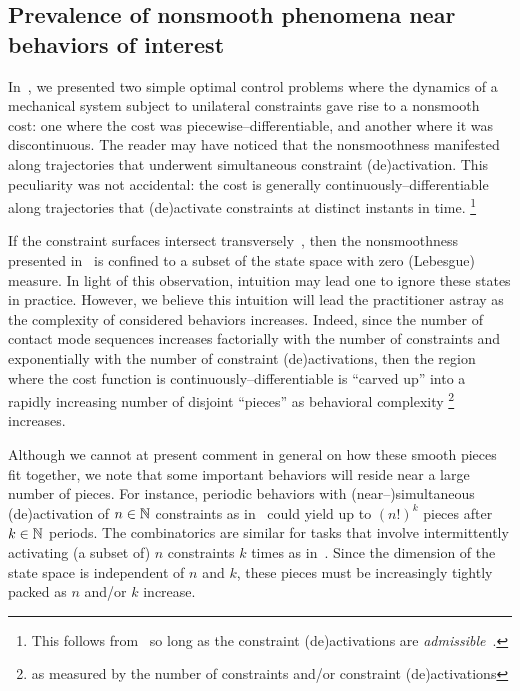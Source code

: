 \documentclass{article}
\begin{document}
\subsection{Prevalence of nonsmooth phenomena near behaviors of interest}
\label{sec:disc:models}
In~, we presented two simple optimal control problems where the dynamics of a mechanical system subject to unilateral constraints gave rise to a nonsmooth cost:
one where the cost was piecewise--differentiable,
and
another where it was discontinuous.
The reader may have noticed that the nonsmoothness manifested along trajectories that underwent simultaneous constraint (de)activation.
This peculiarity was not accidental:  
the cost is generally continuously--differentiable
along trajectories that (de)activate constraints at distinct instants in time.%
\footnote{This follows from~\cite[Eqn.~2.3]{Aizerman1958-ih} so long as the constraint (de)activations are \emph{admissible}~\cite[Def.~3,~Lem.~1]{Pace2017-tt}.}

If the constraint surfaces intersect transversely~\cite[Ch.~6]{Lee2012-mb},
then the nonsmoothness presented in~ is confined to a subset of the state space with zero (Lebesgue) measure. In light of this observation, intuition may lead one to ignore these states in practice. %
However, we believe this intuition will lead the practitioner astray as the complexity of considered behaviors increases.
%
Indeed, since the number of contact mode sequences increases 
factorially with the number of constraints
and 
exponentially with the number of constraint (de)activations,
then the region where the cost function is continuously--differentiable is ``carved up'' into a rapidly increasing number of disjoint ``pieces''
as behavioral complexity%
\footnote{as measured by the number of constraints and/or constraint (de)activations}
increases.

Although we cannot at present comment in general on how these smooth pieces fit together, we note that some important behaviors will reside near a large number of pieces.
For instance, periodic behaviors with (near--)simultaneous (de)activation of $n\in\mathbb{N}$ constraints as in~\cite{Alexander1984-ld} could yield up to $(n!)^k$ pieces after $k\in\mathbb{N}$ periods.
The combinatorics are similar for tasks that involve intermittently activating (a subset of) $n$ constraints $k$ times as in~\cite{Mordatch2012-ar}.
Since the dimension of the state space is independent of $n$ and $k$, these pieces must be increasingly tightly packed as $n$ and/or $k$ increase.
\end{document}
